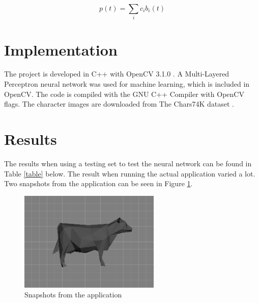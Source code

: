 \documentclass[12pt]{report}
\begin{document}
\begin{equation}
  \label{eq:3}
  p(t) = \sum_i c_ib_i(t) %
\end{equation}


\section*{Implementation}

The project is developed in C++ with OpenCV 3.1.0 \cite{opencv}. A Multi-Layered Perceptron neural network was used for machine learning, which is included in OpenCV.  The code is compiled with the GNU C++ Compiler with OpenCV flags.  The character images are downloaded from The Chars74K dataset \cite{dataset}.


\section*{Results}

The results when using a testing set to test the neural network can be found in Table \ref{table} below. The result when running the actual application varied a lot. Two snapshots from the application can be seen in Figure \ref{fig:result}.

\begin{figure}[!ht]
	\centering
	\includegraphics[width=0.6\textwidth]{figure.png}
	\caption{\label{fig:result} Snapshots from the application}
	\centering
\end{figure}
\end{document}
